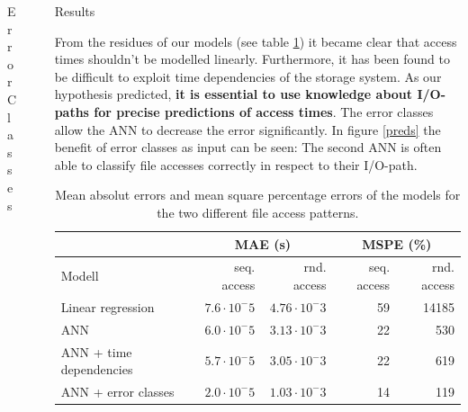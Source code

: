 \documentclass[final]{beamer}
\newlength{\sepwid}
\newlength{\onecolwid}
\begin{document}
\begin{frame}[t]
\begin{columns}[t]
\begin{column}{\onecolwid}
\begin{block}{Error Classes}

\end{block}

\end{column} %

\begin{column}{\sepwid}\end{column} %

\begin{column}{\onecolwid} %

\begin{block}{Results}
	
	From the residues of our models (see table \ref{residues}) it became clear that access times shouldn't be modelled linearly.
	Furthermore, it has been found to be difficult to exploit time dependencies of the storage system.
	As our hypothesis predicted, \textbf{it is essential to use knowledge about I/O-paths for precise predictions of access times}.
	The error classes allow the ANN to decrease the error significantly.
	In figure \ref{preds} the benefit of error classes as input can be seen:
	The second ANN is often able to classify file accesses correctly in respect to their I/O-path.
	
	\begin{table}
		\scriptsize
		\vspace{0.2cm}
		\begin{tabular}{l|r|r|r|r}%
			&  \multicolumn{2}{|c}{MAE (s)}&  \multicolumn{2}{|c}{MSPE (\%)}\\ \hline
			Modell & seq. access & rnd. access & seq. access & rnd. access\\ \hline
			Linear regression & $7.6\cdot 10^-5$ & $4.76\cdot 10^-3$ & 59 & 14185  \\
			ANN & $6.0\cdot 10^-5$ & $3.13\cdot 10^-3$ & 22 & 530 \\
			ANN + time dependencies & $5.7\cdot 10^-5$ & $3.05\cdot 10^-3$ & 22 & 619\\
			ANN + error classes & $2.0\cdot 10^-5$ & $1.03\cdot 10^-3$ & 14 & 119\\
		\end{tabular}
		\caption{Mean absolut errors and mean square percentage errors of the models for the two different file access patterns.}
		\label{residues}
	\end{table}
	

\end{block}
\end{column}
\end{columns}
\end{frame}
\end{document}
